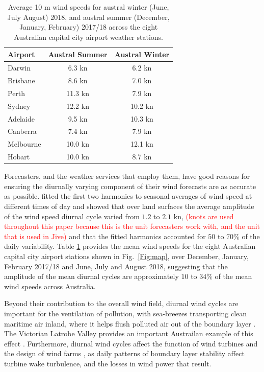 \documentclass{ametsoc}
\begin{document}
\begin{table}
\begin{center}
\begin{tabular}{l |c|c}
Airport & Austral Summer & Austral Winter \\
\hline
Darwin  & 6.3 kn& 6.2 kn \\
Brisbane  & 8.6 kn& 7.0 kn \\
Perth  & 11.3 kn& 7.9 kn \\
Sydney  & 12.2 kn & 10.2 kn \\
Adelaide  & 9.5 kn & 10.3 kn \\
Canberra  & 7.4 kn & 7.9 kn \\
Melbourne  & 10.0 kn & 12.1 kn \\
Hobart & 10.0 kn & 8.7 kn
\end{tabular}
\caption{Average 10 m wind speeds for austral winter (June, July August) 2018, and austral summer (December, January, February) 2017/18 across the eight Australian capital city airport weather stations.}
\label{Tab:Speeds}
\end{center}
\end{table}

Forecasters, and the weather services that employ them, have good reasons for ensuring the diurnally varying component of their wind forecasts are as accurate as possible. \citet{dai99} fitted the first two harmonics to seasonal averages of wind speed at different times of day and showed that over land surfaces the average amplitude of the wind speed diurnal cycle varied from $1.2$ to $2.1$ kn, \textcolor{red}{(knots are used throughout this paper because this is the unit forecasters work with, and the unit that is used in Jive)} and that the fitted harmonics accounted for $50$ to $70\%$ of the daily variability. Table \ref{Tab:Speeds} provides the mean wind speeds for the eight Australian capital city airport stations shown in Fig.~\ref{Fig:map}, over December, January, February 2017/18 and June, July and August 2018, suggesting that the amplitude of the mean diurnal cycles are approximately $10$ to $34\%$ of the mean wind speeds across Australia. 

Beyond their contribution to the overall wind field, diurnal wind cycles are important for the ventilation of pollution, with sea-breezes transporting clean maritime air inland, where it helps flush polluted air out of the boundary layer \citep{miller03}. The Victorian Latrobe Valley provides an important Austrailan example of this effect \citep{physick92}. Furthermore, diurnal wind cycles affect the function of wind turbines \citep{englberger18} and the design of wind farms \citep{abkar16}, as daily patterns of boundary layer stability affect turbine wake turbulence, and the losses in wind power that result. 
\end{document}
